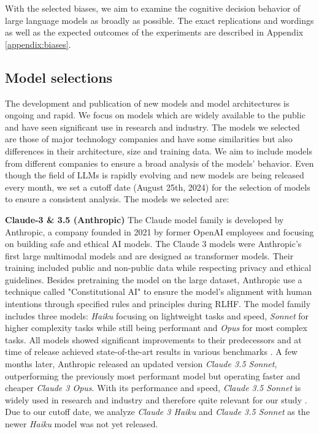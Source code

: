\setlength{\parindent}{0pt}
\par With the selected biases, we aim to examine the cognitive decision behavior of large language models as broadly as possible. The exact replications and wordings as well as the expected outcomes of the experiments are described in Appendix \ref{appendix:biases}.


\subsection{Model selections}
\par The development and publication of new models and model architectures is ongoing and rapid. We focus on models which are widely available to the public and have seen significant use in research and industry. The models we selected are those of major technology companies and have some similarities but also differences in their architecture, size and training data. We aim to include models from different companies to ensure a broad analysis of the models' behavior. Even though the field of LLMs is rapidly evolving and new models are being released every month, we set a cutoff date (August 25th, 2024) for the selection of models to ensure a consistent analysis. The models we selected are:

\setlength{\parindent}{20pt}
\par \textbf{Claude-3 \& 3.5 (Anthropic)} The Claude model family is developed by Anthropic, a company founded in 2021 by former OpenAI employees and focusing on building safe and ethical AI models. The Claude 3 models were Anthropic's first large multimodal models and are designed as transformer models. Their training included public and non-public data while respecting privacy and ethical guidelines. Besides pretraining the model on the large dataset, Anthropic use a technique called "Constitutional AI" to ensure the model's alignment with human intentions through specified rules and principles during RLHF. The model family includes three models: \textit{Haiku} focusing on lightweight tasks and speed, \textit{Sonnet} for higher complexity tasks while still being performant and \textit{Opus} for most complex tasks. All models showed significant improvements to their predecessors and  at time of release achieved state-of-the-art results in various benchmarks \parencite{anthropic2024claude}. A few months later, Anthropic released an updated version \textit{Claude 3.5 Sonnet}, outperforming the previously most performant model but operating faster and cheaper \textit{Claude 3 Opus}. With its performance and speed, \textit{Claude 3.5 Sonnet} is widely used in research and industry and therefore quite relevant for our study \parencite{anthropic2024claude2}. Due to our cutoff date, we analyze \textit{Claude 3 Haiku} and \textit{Claude 3.5 Sonnet} as the newer \textit{Haiku} model was not yet released. 

